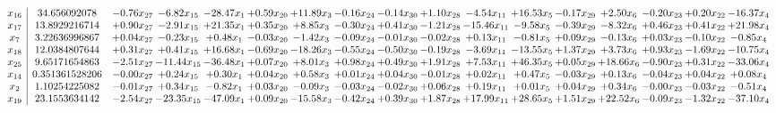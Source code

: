 \documentclass[9pt]{article}
\begin{document}
 \[\begin{array}{c| c c@{\hskip 2pt} c@{\hskip 2pt} c@{\hskip 2pt} c@{\hskip 2pt} c@{\hskip 2pt} c@{\hskip 2pt} c@{\hskip 2pt} c@{\hskip 2pt} c@{\hskip 2pt} c@{\hskip 2pt} c@{\hskip 2pt} c@{\hskip 2pt} c@{\hskip 2pt} c@{\hskip 2pt} c@{\hskip 2pt} }
 x_{16}   &  34.656092078 & -0.76 x_{27} & -6.82 x_{15} & -28.47 x_{1} & +  0.59 x_{20} & + 11.89 x_{3} & -0.16 x_{24} & -0.14 x_{30} & +  1.10 x_{28} & -4.54 x_{11} & + 16.53 x_{5} & -0.17 x_{29} & +  2.50 x_{6} & -0.20 x_{23} & +  0.20 x_{22} & -16.37 x_{4}\\
 x_{17}   &  13.8929216714 & +  0.90 x_{27} & -2.91 x_{15} & + 21.35 x_{1} & +  0.35 x_{20} & +  8.85 x_{3} & -0.30 x_{24} & +  0.41 x_{30} & -1.21 x_{28} & -15.46 x_{11} & -9.58 x_{5} & -0.39 x_{29} & -8.32 x_{6} & +  0.46 x_{23} & +  0.41 x_{22} & + 21.98 x_{4}\\
 x_{7}   &  3.22636996867 & +  0.04 x_{27} & -0.23 x_{15} & +  0.48 x_{1} & -0.03 x_{20} & -1.42 x_{3} & -0.09 x_{24} & -0.01 x_{30} & -0.02 x_{28} & +  0.13 x_{11} & -0.81 x_{5} & +  0.09 x_{29} & -0.13 x_{6} & +  0.03 x_{23} & -0.10 x_{22} & -0.85 x_{4}\\
 x_{18}   &  12.0384807644 & +  0.31 x_{27} & +  0.41 x_{15} & + 16.68 x_{1} & -0.69 x_{20} & -18.26 x_{3} & -0.55 x_{24} & -0.50 x_{30} & -0.19 x_{28} & -3.69 x_{11} & -13.55 x_{5} & +  1.37 x_{29} & +  3.73 x_{6} & +  0.93 x_{23} & -1.69 x_{22} & -10.75 x_{4}\\
 x_{25}   &  9.65171654863 & -2.51 x_{27} & -11.44 x_{15} & -36.48 x_{1} & +  0.07 x_{20} & +  8.01 x_{3} & +  0.98 x_{24} & +  0.49 x_{30} & +  1.91 x_{28} & +  7.53 x_{11} & + 46.35 x_{5} & +  0.05 x_{29} & + 18.66 x_{6} & -0.90 x_{23} & +  0.31 x_{22} & -33.06 x_{4}\\
 x_{14}   &  0.351361528206 & -0.00 x_{27} & +  0.24 x_{15} & +  0.30 x_{1} & +  0.04 x_{20} & +  0.58 x_{3} & +  0.01 x_{24} & +  0.04 x_{30} & -0.01 x_{28} & +  0.02 x_{11} & +  0.47 x_{5} & -0.03 x_{29} & +  0.13 x_{6} & -0.04 x_{23} & +  0.04 x_{22} & +  0.08 x_{4}\\
 x_{2}   &  1.10254225082 & -0.01 x_{27} & +  0.34 x_{15} & -0.82 x_{1} & +  0.03 x_{20} & -0.09 x_{3} & -0.03 x_{24} & -0.02 x_{30} & +  0.06 x_{28} & +  0.19 x_{11} & +  0.01 x_{5} & +  0.04 x_{29} & +  0.34 x_{6} & -0.00 x_{23} & -0.03 x_{22} & -0.51 x_{4}\\
 x_{19}   &  23.1553634142 & -2.54 x_{27} & -23.35 x_{15} & -47.09 x_{1} & +  0.09 x_{20} & -15.58 x_{3} & -0.42 x_{24} & +  0.39 x_{30} & +  1.87 x_{28} & + 17.99 x_{11} & + 28.65 x_{5} & +  1.51 x_{29} & + 22.52 x_{6} & -0.09 x_{23} & -1.32 x_{22} & -37.10 x_{4}\\

\end{array}\]
\end{document}
